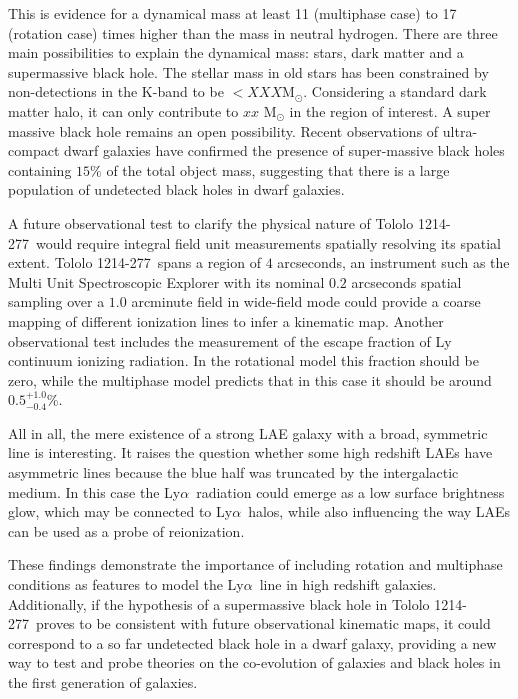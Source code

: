 \documentclass[a4paper, usenatbib, 12pt]{article}
\newcommand{\tol}{Tololo 1214-277}
\newcommand{\lya}{Ly$\alpha$}
\begin{document}
{This is evidence for a dynamical mass at least 11 (multiphase case) to
17 (rotation case) times higher than the mass in neutral hydrogen.  
There are three main possibilities to explain the dynamical 
mass: stars, dark matter and a supermassive black hole. 
The stellar mass in old stars has been constrained by non-detections
in the K-band to be $<XXX$M$_{\odot}$.
Considering a standard dark matter halo, it can only contribute to
$xx$ M$_{\odot}$ in the region of interest. 
A super massive black hole remains an open possibility. 
Recent observations of ultra-compact dwarf galaxies
\cite{Seth2014} have confirmed the presence of super-massive black
holes containing $15\%$ of the total object mass, suggesting that
there is a large population of undetected black holes in dwarf
galaxies.  


A future observational test to clarify the physical nature of
\tol\ would require integral field unit measurements spatially
resolving its spatial extent. 
\tol\ spans a region of $4$ arcseconds,
an instrument such as the Multi Unit Spectroscopic Explorer with its
nominal $0.2$ arcseconds spatial sampling over a $1.0$ arcminute field
in wide-field mode could provide a coarse mapping of different
ionization lines to infer a kinematic map.
Another observational test includes the measurement of the escape
fraction of Ly continuum ionizing radiation. 
In the rotational model this fraction should be zero, while
the multiphase model predicts that in this case it should be around
$0.5^{+1.0}_{-0.4}$\%. 

All in all, the mere existence of a strong LAE galaxy with a broad,
symmetric line is interesting.
It raises the question whether some high redshift LAEs have asymmetric
lines because the blue half was truncated by the intergalactic medium.
In this case the \lya\ radiation could emerge as a low surface
brightness glow, which may be connected to \lya\ halos, while also
influencing the way LAEs can be used as a probe of reionization. 

These findings demonstrate the importance of including rotation and multiphase
conditions as features to model the \lya\ line in high redshift
galaxies.
Additionally, if the hypothesis of a supermassive black
hole in \tol\ proves to be consistent with future observational
kinematic maps, it could correspond to a so far undetected black hole
in a dwarf galaxy, providing a new way to test and probe
theories on the co-evolution of galaxies and black holes in the first
generation of galaxies.  

}
\end{document}
